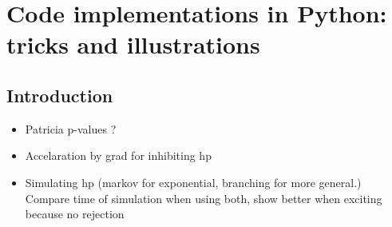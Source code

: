 \leadchapter{
  
}

\chapter[][]{Code implementations in Python: tricks and illustrations}

\section{Introduction}

\begin{itemize}
    \item Patricia p-values ? 
    \item Accelaration by grad for inhibiting hp 
    \item Simulating hp (markov for exponential, branching for more general.) Compare time of simulation 
    when using both, show better when exciting because no rejection
\end{itemize}